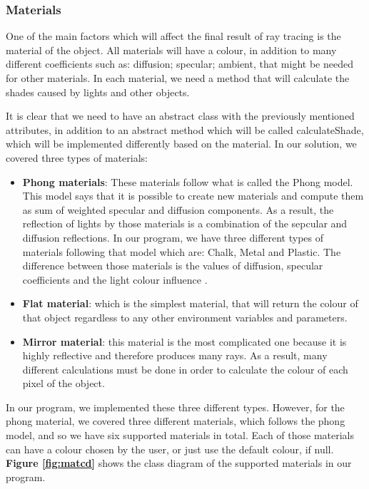 \documentclass[a4paper]{report}
\begin{document}
	\subsubsection{Materials}
	\label{sssec:mat}One of the main factors which will affect the final result of ray tracing is the material of the object. All materials will have a colour, in addition to many different coefficients such as:  diffusion; specular; ambient, that might be needed for other materials. In each material, we need a method that will calculate the shades caused by lights and other objects. \newline
	\par It is clear that we need to have an abstract class with the previously mentioned attributes, in addition to an abstract method which will be called calculateShade, which will be implemented differently based on the material. In our solution, we covered three types of materials:
	\begin{itemize}
		\item \textbf{Phong materials}:  These materials follow what is called the Phong model. This model says that it is possible to create new materials and compute them as sum of weighted specular and diffusion components. As a result, the reflection of lights by those materials is a combination of the sepcular and diffusion reflections. In our program, we have three different types of materials following that model which are: Chalk, Metal and Plastic. The difference between those materials is the values of diffusion, specular coefficients and the light colour influence \cite{scratchapixel_phong_2015}.
		\item \textbf{Flat material}: which is the simplest material, that will return the colour of that object regardless to any other environment variables and parameters.
		\item \textbf {Mirror material}: this material is the most complicated one because it is highly reflective and therefore produces many rays. As a result, many different calculations must be done in order to calculate the colour of each pixel of the object.
	\end{itemize}
	In our program, we implemented these three different types. However, for the phong material, we covered three different materials, which follows the phong model, and so we have six supported materials in total. Each of those materials can have a colour chosen by the user, or just use the default colour, if null. \textbf{Figure \ref{fig:matcd}} shows the class diagram of the supported materials in our program.
\end{document}
